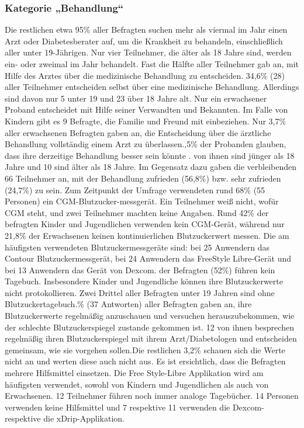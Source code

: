 \documentclass[a4paper,11pt]{article}%
\renewcommand{\\}{\vspace*{0.5\baselineskip} \newline}
\begin{document}
	\subsubsection{Kategorie „Behandlung“}
	Die restlichen etwa 95\% aller Befragten suchen mehr als viermal im Jahr einen Arzt oder Diabetesberater auf, um die Krankheit zu behandeln, einschließlich aller unter 19-Jährigen. Nur vier Teilnehmer, die älter als 18 Jahre sind, werden ein- oder zweimal im Jahr behandelt. Fast die Hälfte aller Teilnehmer gab an, mit Hilfe des Arztes über die medizinische Behandlung zu entscheiden. 34,6\% (28) aller Teilnehmer entscheiden selbst über eine medizinische Behandlung. Allerdings sind davon nur 5 unter 19 und 23 über 18 Jahre alt. Nur ein erwachsener Proband entscheidet mit Hilfe seiner Verwandten und Bekannten. Im Falle von Kindern gibt es 9 Befragte, die Familie und Freund mit einbeziehen.\newline
	Nur 3,7\% aller erwachsenen Befragten gaben an, die Entscheidung über die ärztliche Behandlung vollständig einem Arzt zu überlassen.,5\% der Probanden glauben, dass ihre derzeitige Behandlung \glqq besser sein könnte \grqq{}.  von ihnen sind jünger als 18 Jahre und 10 sind älter als 18 Jahre. Im Gegensatz dazu gaben die verbleibenden 66 Teilnehmer an, mit der Behandlung zufrieden (56,8\%) bzw. sehr zufrieden (24,7\%) zu sein.\newline
	Zum Zeitpunkt der Umfrage verwendeten rund 68\% (55 Personen) ein CGM-Blutzucker-messgerät. Ein Teilnehmer weiß nicht, wofür CGM steht, und zwei Teilnehmer machten keine Angaben.\newline
	Rund 42\% der befragten Kinder und Jugendlichen verwenden kein CGM-Gerät, während nur 21,8\% der Erwachsenen keinen kontinuierlichen Blutzuckerwert messen.\newline
	Die am häufigsten verwendeten Blutzuckermessgeräte sind: bei 25 Anwendern das Contour Blutzuckermessgerät, bei 24 Anwendern das FreeStyle Libre-Gerät und bei 13 Anwendern das Gerät von Dexcom. der Befragten (52\%) führen kein Tagebuch. Insbesondere Kinder und Jugendliche können ihre Blutzuckerwerte nicht protokollieren. Zwei Drittel aller Befragten unter 19 Jahren sind ohne Blutzuckertagebuch.\% (37 Antworten) aller Befragten gaben an, ihre Blutzuckerwerte regelmäßig anzuschauen und versuchen herauszubekommen, wie der schlechte Blutzuckerspiegel zustande gekommen ist. 12 von ihnen besprechen regelmäßig ihren Blutzuckerspiegel mit ihrem Arzt/Diabetologen und entscheiden gemeinsam, wie sie vorgehen sollen.Die restlichen 3,2\% schauen \glqq  sich die Werte nicht an und werten diese auch nicht aus\grqq{}.\newline
	Es ist ersichtlich, dass die Befragten mehrere Hilfsmittel einsetzen. Die Free Style-Libre Applikation wird am häufigsten verwendet, sowohl von Kindern und Jugendlichen als auch von Erwachsenen. 12 Teilnehmer führen noch immer analoge Tagebücher. 14 Personen verwenden keine Hilfsmittel und 7 respektive 11 verwenden die Dexcom- respektive die xDrip-Applikation.
\end{document}
